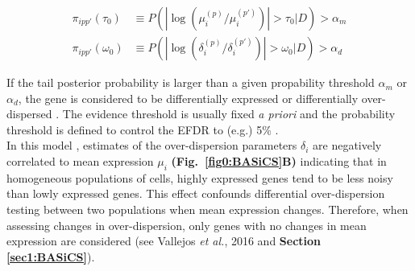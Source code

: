 \begin{align*}
\pi_{ipp'}(\tau_0)&\equiv{}P(|\log(\mu_i^{(p)}/\mu_i^{(p')})|>\tau_0|D)>\alpha_m\\
\pi_{ipp'}(\omega_0)&\equiv{}P(|\log(\delta_i^{(p)}/\delta_i^{(p')})|>\omega_0|D)>\alpha_d
\end{align*}

\newpage

If the tail posterior probability is larger than a given propability threshold $\alpha_m$ or $\alpha_d$, the gene is considered to be differentially expressed or differentially over-dispersed \citep{Vallejos2016}. 
The evidence threshold is usually fixed \emph{a priori} and the probability threshold is defined to control the \gls{EFDR} to (e.g.) 5\% \cite{Newton2004, Vallejos2016}.\\

In this model \citep{Vallejos2016}, estimates of the over-dispersion parameters $\delta_i$ are negatively correlated to mean expression $\mu_i$ \textbf{(Fig.~\ref{fig0:BASiCS}B)} indicating that in homogeneous populations of cells, highly expressed genes tend to be less noisy than lowly expressed genes. 
This effect confounds differential over-dispersion testing between two populations when mean expression changes. 
Therefore, when assessing changes in over-dispersion, only genes with no changes in mean expression are considered (see Vallejos \emph{et al.}, 2016 \citep{Vallejos2016} and \textbf{Section \ref{sec1:BASiCS}}).  
